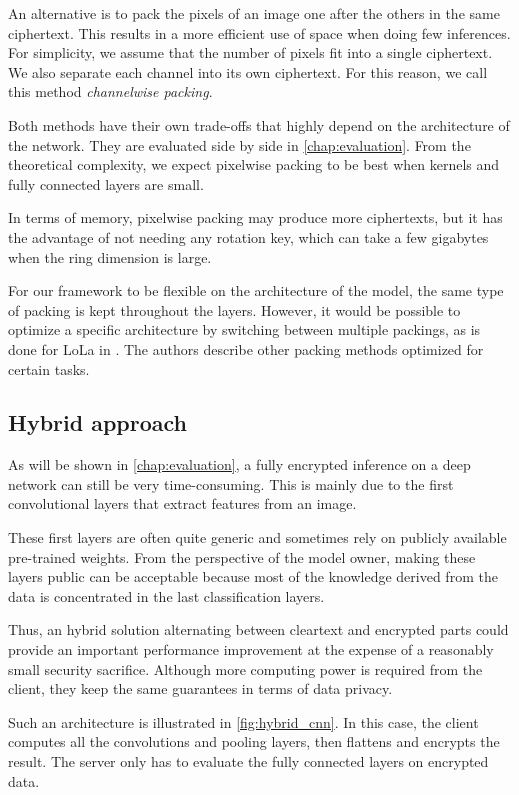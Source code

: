 \documentclass[a4paper,11pt,oneside]{report}
\begin{document}
An alternative is to pack the pixels of an image one after the others in the same ciphertext. 
This results in a more efficient use of space when doing few inferences. For simplicity, we assume that the number of pixels fit into a single ciphertext. 
We also separate each channel into its own ciphertext. 
For this reason, we call this method \emph{channelwise packing}.

Both methods have their own trade-offs that highly depend on the architecture of the network. 
They are evaluated side by side in \autoref{chap:evaluation}. 
From the theoretical complexity, we expect pixelwise packing to be best when kernels and fully connected layers are small.

In terms of memory, pixelwise packing may produce more ciphertexts, but it has the advantage of not needing any rotation key, which can take a few gigabytes when the ring dimension is large.

For our framework to be flexible on the architecture of the model, the same type of packing is kept throughout the layers. 
However, it would be possible to optimize a specific architecture by switching between multiple packings, as is done for LoLa in \cite{brutzkus_low_2019}. 
The authors describe other packing methods optimized for certain tasks.

\subsection{Hybrid approach}\label{sec:hybrid_cnn}

As will be shown in \autoref{chap:evaluation}, a fully encrypted inference on a deep network can still be very time-consuming.
This is mainly due to the first convolutional layers that extract features from an image.

These first layers are often quite generic and sometimes rely on publicly available pre-trained weights.
From the perspective of the model owner, making these layers public can be acceptable because most of the knowledge derived from the data is concentrated in the last classification layers.

Thus, an hybrid solution alternating between cleartext and encrypted parts could provide an important performance improvement at the expense of a reasonably small security sacrifice.
Although more computing power is required from the client, they keep the same guarantees in terms of data privacy.

Such an architecture is illustrated in \autoref{fig:hybrid_cnn}.
In this case, the client computes all the convolutions and pooling layers, then flattens and encrypts the result. 
The server only has to evaluate the fully connected layers on encrypted data.
\end{document}
